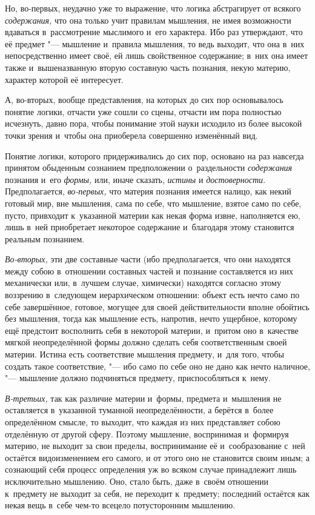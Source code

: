 Но, во-первых, неудачно уже то выражение, что логика абстрагирует от всякого
{\em содержания,} что она только учит правилам
мышления, не имея возможности вдаваться в~рассмотрение мыслимого и~его
характера. Ибо раз утверждают, что её предмет "--- мышление и~правила
мышления, то ведь выходит, что она в~них непосредственно имеет своё, ей
лишь свойственное содержание; в~них она имеет также и~вышеназванную вторую
составную часть познания, некую материю, характер которой её интересует.

А, во-вторых, вообще представления, на которых до сих пор
основывалось понятие логики, отчасти уже сошли со сцены, отчасти им
пора полностью исчезнуть, давно пора, чтобы понимание этой науки
исходило из более высокой точки зрения и~чтобы она приоберела совершенно
изменённый вид.

Понятие логики, которого придерживались до сих пор, основано на раз навсегда
принятом обыденным сознанием предположении о~раздельности {\em содержания}
познания и~его {\em формы,} или, иначе сказать, {\em истины} и
{\em достоверности}. Предполагается, {\em во-первых,} что материя познания
имеется налицо, как некий готовый мир, вне мышления, сама по себе, что
мышление, взятое само по себе, пусто, привходит к~указанной материи как
некая форма извне, наполняется ею, лишь в~ней приобретает некоторое
содержание и~благодаря этому становится реальным познанием.

{\em Во-вторых,} эти две составные части (ибо
предполагается, что они находятся между собою в~отношении составных частей
и познание составляется из них механически или, в~лучшем случае, химически)
находятся согласно этому воззрению в~следующем иерархическом отношении:
объект есть нечто само по себе завершённое, готовое, могущее для своей
действительности вполне обойтись без мышления, тогда как мышление есть,
напротив, нечто ущербное, которому ещё предстоит восполнить себя в
некоторой материи, и~притом оно в~качестве мягкой неопределённой формы
должно сделать себя соответственным своей материи. Истина есть соответствие
мышления предмету, и~для того, чтобы создать такое соответствие, "--- ибо само
по себе оно не дано как нечто наличное, "--- мышление должно подчиняться
предмету, приспособляться к~нему.

{\em В-третьих,} так как различие материи и~формы,
предмета и~мышления не оставляется в~указанной туманной неопределённости, а
берётся в~более определённом смысле, то выходит, что каждая из них
представляет собою отделённую от другой сферу. Поэтому мышление,
воспринимая и~формируя материю, не выходит за свои пределы, воспринимание
её и~сообразование с~ней остаётся видоизменением его самого,
и от этого оно не становится своим иным; а
сознающий себя процесс определения уж во всяком случае принадлежит лишь
исключительно мышлению. Оно, стало быть, даже в~своём отношении к~предмету не
выходит за себя, не переходит к~предмету; последний остаётся как некая вещь в~себе
чем-то всецело потусторонним мышлению.

